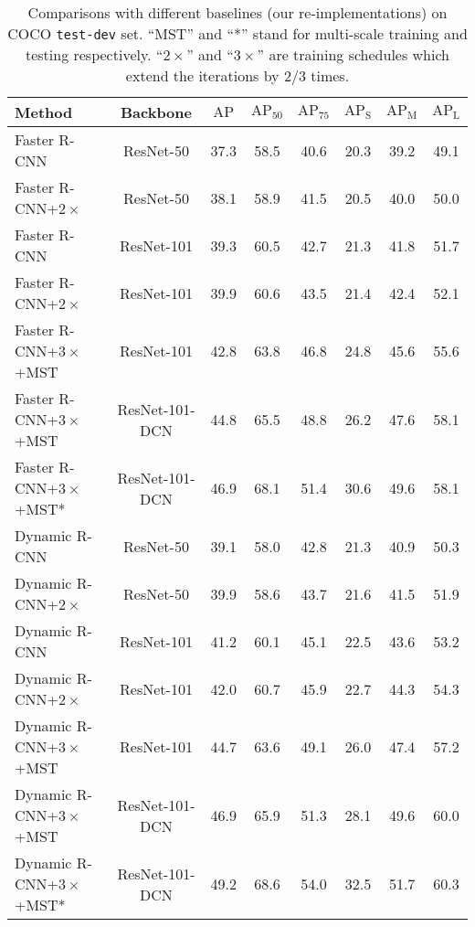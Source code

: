 \documentclass[runningheads]{llncs}
\begin{document}
\begin{table}[!t]
    \caption{Comparisons with different baselines (our re-implementations) on COCO \texttt{test-dev} set. ``MST'' and ``*'' stand for multi-scale training and testing respectively. ``$2\times$'' and ``$3\times$'' are training schedules which extend the iterations by $2/3$ times.}
    \label{tab:main_comparison}
    \begin{center}
\setlength{\tabcolsep}{2pt}
\begin{tabular}{lccccccc}
\toprule
Method & Backbone & $\mathrm{AP}$ & $\mathrm{AP}_{50}$ & $\mathrm{AP}_{75}$ & $\mathrm{AP_S}$ & $\mathrm{AP_M}$ & $\mathrm{AP_L}$\\
\midrule
Faster R-CNN & ResNet-50 & 37.3 & 58.5 & 40.6 & 20.3 & 39.2 & 49.1\\
Faster R-CNN+$2\times$ & ResNet-50 & 38.1 & 58.9 & 41.5 & 20.5 & 40.0 & 50.0\\
Faster R-CNN & ResNet-101 & 39.3 & 60.5 & 42.7 & 21.3 & 41.8 & 51.7\\
Faster R-CNN+$2\times$ & ResNet-101 & 39.9 & 60.6 & 43.5 & 21.4 & 42.4 & 52.1\\
Faster R-CNN+$3\times$+MST & ResNet-101 & 42.8 & 63.8 & 46.8 & 24.8 & 45.6 & 55.6\\
Faster R-CNN+$3\times$+MST & ResNet-101-DCN & 44.8 & 65.5 & 48.8 & 26.2 & 47.6 & 58.1\\
Faster R-CNN+$3\times$+MST* & ResNet-101-DCN & 46.9 & 68.1 & 51.4 & 30.6 & 49.6 & 58.1\\
\midrule
Dynamic R-CNN & ResNet-50 & 39.1 & 58.0 & 42.8 & 21.3 & 40.9 & 50.3\\
Dynamic R-CNN+$2\times$ & ResNet-50 & 39.9 & 58.6 & 43.7 & 21.6 & 41.5 & 51.9\\
Dynamic R-CNN & ResNet-101 & 41.2 & 60.1 & 45.1 & 22.5 & 43.6 & 53.2\\
Dynamic R-CNN+$2\times$ & ResNet-101 & 42.0 & 60.7 & 45.9 & 22.7 & 44.3 & 54.3\\
Dynamic R-CNN+$3\times$+MST & ResNet-101 & 44.7 & 63.6 & 49.1 & 26.0 & 47.4 & 57.2\\
Dynamic R-CNN+$3\times$+MST & ResNet-101-DCN & 46.9 & 65.9 & 51.3 & 28.1 & 49.6 & 60.0\\
Dynamic R-CNN+$3\times$+MST* & ResNet-101-DCN & 49.2 & 68.6 & 54.0 & 32.5 & 51.7 & 60.3\\
\bottomrule
\end{tabular}
\end{center}
 \end{table}
\end{document}

